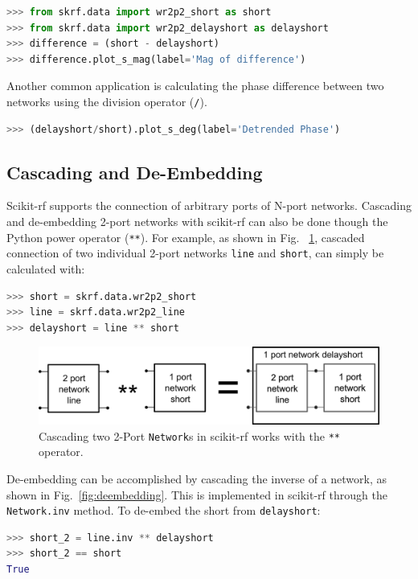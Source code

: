 \documentclass[journal, onecolumn]{IEEEtran}
\begin{document}
\begin{lstlisting}[language=Python]
>>> from skrf.data import wr2p2_short as short
>>> from skrf.data import wr2p2_delayshort as delayshort
>>> difference = (short - delayshort)
>>> difference.plot_s_mag(label='Mag of difference')
\end{lstlisting}

Another common application is calculating the phase difference between two networks using the division operator (\texttt{/}). 

\begin{lstlisting}[language=Python]
>>> (delayshort/short).plot_s_deg(label='Detrended Phase')
\end{lstlisting}

\subsection{Cascading and De-Embedding}
Scikit-rf supports the connection of arbitrary ports of N-port networks. Cascading and de-embedding 2-port networks with scikit-rf can also be done though the Python power operator (\texttt{**}). For example, as shown in Fig. ~\ref{fig:cascading}, cascaded connection of two individual 2-port networks \texttt{line} and \texttt{short}, can simply be calculated with:

\begin{lstlisting}[language=Python]
>>> short = skrf.data.wr2p2_short
>>> line = skrf.data.wr2p2_line
>>> delayshort = line ** short
\end{lstlisting}

\begin{figure}
	\centering
	\includegraphics[width=0.95\linewidth]{figures/cascading}
	\caption{Cascading two 2-Port \texttt{Network}s in scikit-rf works with the \texttt{**} operator.}
	\label{fig:cascading}
\end{figure}

De-embedding can be accomplished by cascading the inverse of a network, as shown in Fig.~\ref{fig:deembedding}. This is implemented in scikit-rf through the \texttt{Network.inv} method. To de-embed the short from \texttt{delayshort}:

\begin{lstlisting}[language=Python]
>>> short_2 = line.inv ** delayshort
>>> short_2 == short
True
\end{lstlisting}
\end{document}
